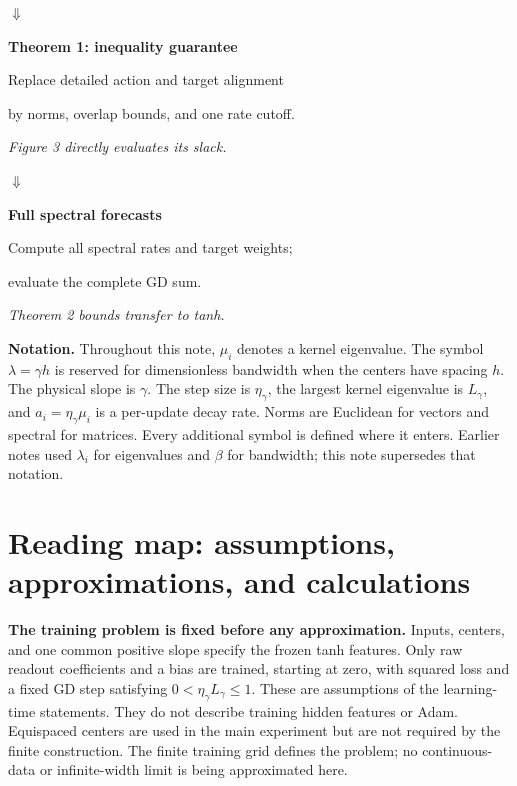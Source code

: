 \documentclass[11pt]{article}
\theoremstyle{definition}
\begin{document}
\begin{center}
\setlength{\fboxsep}{8pt}
\par\vspace{6pt}
\begin{minipage}[t]{0.46\linewidth}\centering
$\Downarrow$\par
\textbf{Theorem 1: inequality guarantee}\par
Replace detailed action and target alignment\par
by norms, overlap bounds, and one rate cutoff.\par
\textit{Figure 3 directly evaluates its slack.}
\end{minipage}\hfill
\begin{minipage}[t]{0.48\linewidth}\centering
$\Downarrow$\par
\textbf{Full spectral forecasts}\par
Compute all spectral rates and target weights;\par
evaluate the complete GD sum.\par
\textit{Theorem 2 bounds transfer to tanh.}
\end{minipage}
\end{center}

\textbf{Notation.} Throughout this note, $\mu_i$ denotes a kernel eigenvalue.
The symbol $\lambda=\gamma h$ is reserved for dimensionless bandwidth when the
centers have spacing $h$. The physical slope is $\gamma$. The step size is
$\eta_\gamma$, the largest kernel eigenvalue is $L_\gamma$, and
$a_i=\eta_\gamma\mu_i$ is a per-update decay rate. Norms are Euclidean for
vectors and spectral for matrices. Every additional symbol is defined where
it enters. Earlier notes used $\lambda_i$ for eigenvalues and $\beta$ for
bandwidth; this note supersedes that notation.

\section*{Reading map: assumptions, approximations, and calculations}
\textbf{The training problem is fixed before any approximation.}
Inputs, centers, and one common positive slope specify the frozen tanh
features. Only raw readout coefficients and a bias are trained, starting at
zero, with squared loss and a fixed GD step satisfying
$0<\eta_\gamma L_\gamma\le1$. These are assumptions of the learning-time
statements. They do not describe training hidden features or Adam.
Equispaced centers are used in the main experiment but are not required by the
finite construction. The finite training grid defines the problem; no
continuous-data or infinite-width limit is being approximated here.
\end{document}
